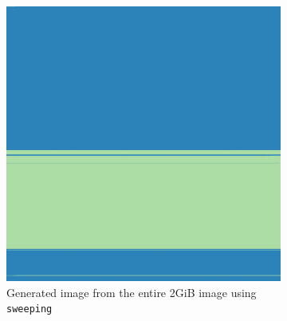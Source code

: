 \documentclass[
  digital, %
  color,   %
  oneside, %
  lof,     %
  nolot,     %
]{fithesis4}
\begin{document}
\begin{figure}
  \centering
  \begin{subfigure}[t]{.45\textwidth}
    \centering
    \includegraphics[width=\textwidth,interpolate=false]{ext4-luks2-sweeping.png}
    \caption{Generated image from the entire 2GiB image using \texttt{sweeping}}
    \label{fig:luks-unenc}
  \end{subfigure}
  \hfill
  \begin{subfigure}[t]{.45\textwidth}
    \centering

\end{subfigure}
\end{figure}
\end{document}
